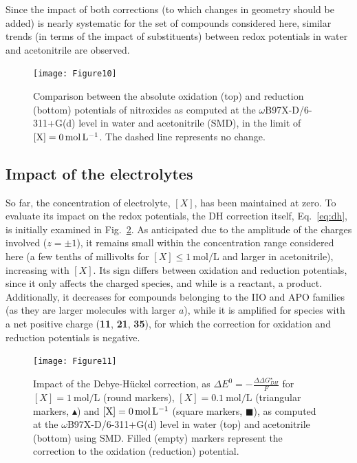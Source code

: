 \documentclass[review,preprint]{elsarticle}
\begin{document}
Since the impact of both corrections (to which changes in geometry should be added) is nearly systematic for the set of compounds considered here, similar trends (in terms of the impact of substituents) between redox potentials in water and acetonitrile are observed.



\begin{figure}[!h]
	\centering
	\texttt{[image: Figure10]}
	\caption{Comparison between the absolute oxidation (top) and reduction (bottom) potentials of nitroxides as computed at the $\omega$B97X-D/6-311+G(d) level in water and acetonitrile (SMD),  in the limit of $[\ce{X}]=\SI{0}{\mole\per\liter}$. The dashed line represents no change. }
	\label{fig:watvsac}
\end{figure}

\clearpage
\subsection{Impact of the electrolytes} \label{sec:elect}

So far, the concentration of electrolyte, $[X]$, has been maintained at zero. To evaluate its impact on the redox potentials, the DH correction itself, Eq.~\eqref{eq:dh}, is initially examined in Fig.~\ref{fig:DH}. As anticipated due to the amplitude of the charges involved ($z=\pm 1$), it remains small within the concentration range considered here (a few tenths of millivolts for $[X] \leq \SI{1}{\mole\per\liter}$ and larger in acetonitrile), increasing with $[X]$. Its sign differs between oxidation and reduction potentials, since it only affects the charged species, and while  is a reactant,  a product. Additionally, it decreases for compounds belonging to the IIO and APO families (as they are larger molecules with larger $a$), while it is amplified for species with a net positive charge (\textbf{11}, \textbf{21}, \textbf{35}), for which the correction for oxidation and reduction potentials is negative.


\begin{figure}[!b]
	\centering
	\texttt{[image: Figure11]}
	\caption{Impact of the Debye-Hückel correction, as $\Delta E^0 = -\frac{\Delta \Delta G_{DH}^\star}{F}$ for $[X]=\SI{1}{\mole\per\liter}$ (round markers), $[X]=\SI{0.1}{\mole\per\liter}$ (triangular markers, $\blacktriangle$)  and $[\ce{X}]=\SI{0}{\mole\per\liter}$ (square markers, $\blacksquare$), as computed at the $\omega$B97X-D/6-311+G(d) level in water (top) and acetonitrile (bottom) using SMD. Filled (empty) markers represent the correction to the oxidation (reduction) potential. }
	\label{fig:DH}
\end{figure}
\end{document}
